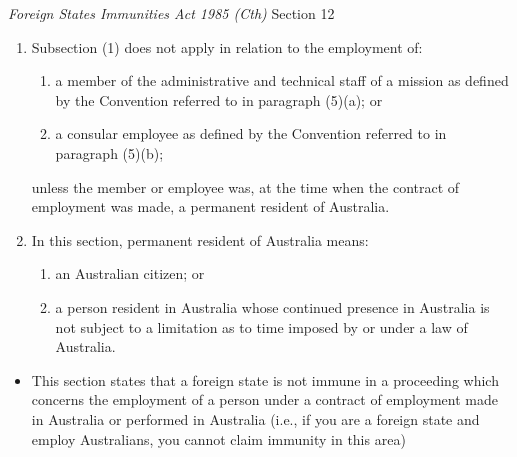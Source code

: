 \begin{statutedetails}{\textit{Foreign States Immunities Act 1985 (Cth)} Section 12}
\begin{enumerate}[label=(\arabic*)]
        \begin{enumerate}
            \item a member of the diplomatic staff of a mission as defined by the Vienna Convention on Diplomatic Relations, being the Convention the English text of which is set out in the Schedule to the Diplomatic Privileges and Immunities Act 1967 ; or
            \item a consular officer as defined by the Vienna Convention on Consular Relations, being the Convention the English text of which is set out in the Schedule to the Consular Privileges and Immunities Act 1972 .
        \end{enumerate}
        \item Subsection (1) does not apply in relation to the employment of:
        \begin{enumerate}[label=(\alph*)]
            \item a member of the administrative and technical staff of a mission as defined by the Convention referred to in paragraph (5)(a); or
            \item a consular employee as defined by the Convention referred to in paragraph (5)(b);
        \end{enumerate}
        unless the member or employee was, at the time when the contract of employment was made, a permanent resident of Australia.
        \item In this section, permanent resident of Australia means:
        \begin{enumerate}
            \item an Australian citizen; or
            \item a person resident in Australia whose continued presence in Australia is not subject to a limitation as to time imposed by or under a law of Australia.
        \end{enumerate}
    \end{enumerate}
\end{statutedetails}

\begin{itemize}
    \item This section states that a foreign state is not immune in a proceeding which concerns the employment of a person under a contract of employment made in Australia or performed in Australia (i.e., if you are a foreign state and employ Australians, you cannot claim immunity in this area)
\end{itemize}

